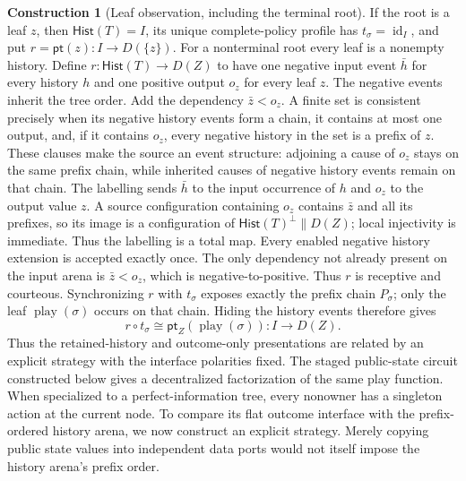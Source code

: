 \documentclass[11pt,a4paper]{article}
\numberwithin{equation}{section}
\theoremstyle{definition}
\newtheorem{construction}[construction]{Construction}
\theoremstyle{remark}
\theoremstyle{plain}
\begin{document}
\begin{construction}[Leaf observation, including the terminal root]
If the root is a leaf $z$, then $\mathsf{Hist}(T)=I$, its unique
complete-policy profile has $t_\sigma=\operatorname{id}_I$, and put
$r=\mathsf{pt}(z):I\to D(\{z\})$.
For a nonterminal root every leaf is a nonempty history. Define $r:\mathsf{Hist}(T)\to D(Z)$ to have one negative input event $\bar h$
for every history $h$ and one positive output $o_z$ for every leaf $z$.
The negative events inherit the tree order. Add the dependency
$\bar z<o_z$. A finite set is consistent precisely when its negative
history events form a chain, it contains at most one output, and, if it
contains $o_z$, every negative history in the set is a prefix of $z$.
These clauses make the source an event structure: adjoining a cause of
$o_z$ stays on the same prefix chain, while inherited causes of negative
history events remain on that chain. The labelling sends $\bar h$ to the
input occurrence of $h$ and $o_z$ to the output value $z$. A source
configuration containing $o_z$ contains $\bar z$ and all its prefixes, so
its image is a configuration of
$\mathsf{Hist}(T)^\perp\parallel D(Z)$; local injectivity is immediate.
Thus the labelling is a total map. Every enabled negative history
extension is accepted exactly once. The only dependency not already
present on the input arena is $\bar z<o_z$, which is
negative-to-positive. Thus $r$ is receptive and courteous. Synchronizing
$r$ with $t_\sigma$ exposes exactly the prefix chain $P_\sigma$; only the
leaf $\operatorname{play}(\sigma)$ occurs on that chain. Hiding the
history events therefore gives
\[
 r\circ t_\sigma
 \cong
 \mathsf{pt}_Z(\operatorname{play}(\sigma)):I\to D(Z).
\]
Thus the retained-history and outcome-only presentations are related by an
explicit strategy with the interface polarities fixed.
The staged public-state circuit constructed below gives a decentralized
factorization of the same play function. When specialized to a
perfect-information tree, every nonowner has a singleton action at the
current node. To compare its flat outcome interface with the prefix-ordered
history arena, we now construct an explicit strategy. Merely copying public
state values into independent data ports would not itself impose the
history arena's prefix order.

\end{construction}
\end{document}
